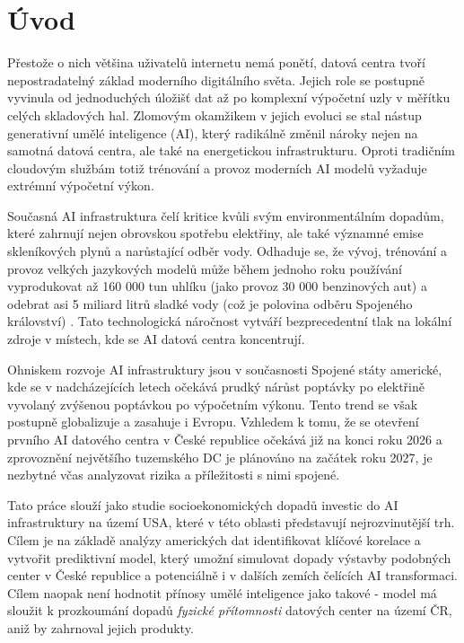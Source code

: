 \chapter*{Úvod}
\setcounter{page}{1}

Přestože o nich většina uživatelů internetu nemá ponětí, datová centra tvoří nepostradatelný základ moderního digitálního světa. Jejich role se postupně vyvinula od jednoduchých úložišť dat až po komplexní výpočetní uzly v měřítku celých skladových hal. Zlomovým okamžikem v jejich evoluci se stal nástup generativní umělé inteligence (AI), který radikálně změnil nároky nejen na samotná datová centra, ale také na energetickou infrastrukturu. Oproti tradičním cloudovým službám totiž trénování a provoz moderních AI modelů vyžaduje extrémní výpočetní výkon.

Současná AI infrastruktura čelí kritice kvůli svým environmentálním dopadům, které zahrnují nejen obrovskou spotřebu elektřiny, ale také významné emise skleníkových plynů a narůstající odběr vody. Odhaduje se, že vývoj, trénování a provoz velkých jazykových modelů může během jednoho roku používání vyprodukovat až 160 000 tun uhlíku (jako provoz 30 000 benzinových aut) \cite{jegham_how_2025} a odebrat asi 5 miliard litrů sladké vody (což je polovina odběru Spojeného království) \cite{li_making_2025}. Tato technologická náročnost vytváří bezprecedentní tlak na lokální zdroje v místech, kde se AI datová centra koncentrují.

Ohniskem rozvoje AI infrastruktury jsou v současnosti Spojené státy americké, kde se v nadcházejících letech očekává prudký nárůst poptávky po elektřině vyvolaný zvýšenou poptávkou po výpočetním výkonu. Tento trend se však postupně globalizuje a zasahuje i Evropu. Vzhledem k tomu, že se otevření prvního AI datového centra v České republice očekává již na konci roku 2026 a zprovoznění největšího tuzemského DC je plánováno na začátek roku 2027, je nezbytné včas analyzovat rizika a příležitosti s nimi spojené.

Tato práce slouží jako studie socioekonomických dopadů investic do AI infrastruktury na území USA, které v této oblasti představují nejrozvinutější trh. Cílem je na základě analýzy amerických dat identifikovat klíčové korelace a vytvořit prediktivní model, který umožní simulovat dopady výstavby podobných center v České republice a potenciálně i v dalších zemích čelících AI transformaci. Cílem naopak není hodnotit přínosy umělé inteligence jako takové - model má sloužit k prozkoumání dopadů \textit{fyzické přítomnosti} datových center na území ČR, aniž by zahrnoval jejich produkty.